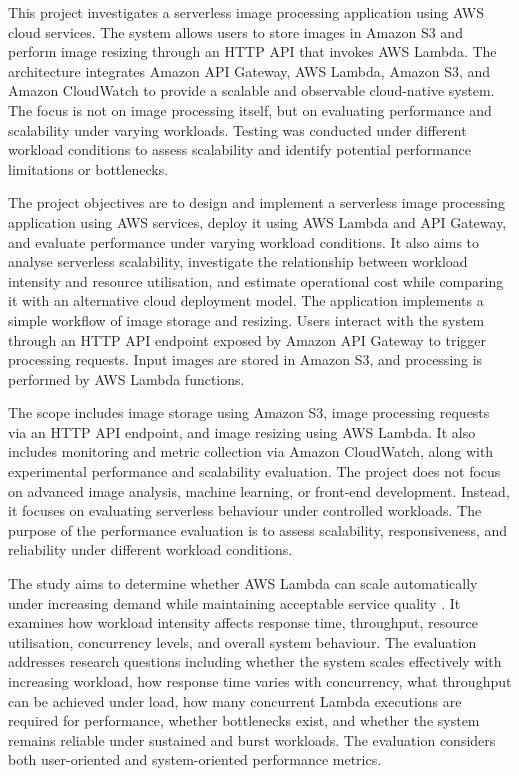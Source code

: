 \documentclass[11pt,a4paper,twocolumn]{article}
\begin{document}
This project investigates a serverless image processing application using AWS cloud services. The system allows users to store images in Amazon S3 and perform image resizing through an HTTP API that invokes AWS Lambda. The architecture integrates Amazon API Gateway, AWS Lambda, Amazon S3, and Amazon CloudWatch to provide a scalable and observable cloud-native system.
The focus is not on image processing itself, but on evaluating performance and scalability under varying workloads. Testing was conducted under different workload conditions to assess scalability and identify potential performance limitations or bottlenecks.

The project objectives are to design and implement a serverless image processing application using AWS services, deploy it using AWS Lambda and API Gateway, and evaluate performance under varying workload conditions. It also aims to analyse serverless scalability, investigate the relationship between workload intensity and resource utilisation, and estimate operational cost while comparing it with an alternative cloud deployment model.
The application implements a simple workflow of image storage and resizing. Users interact with the system through an HTTP API endpoint exposed by Amazon API Gateway to trigger processing requests. Input images are stored in Amazon S3, and processing is performed by AWS Lambda functions.

The scope includes image storage using Amazon S3, image processing requests via an HTTP API endpoint, and image resizing using AWS Lambda. It also includes monitoring and metric collection via Amazon CloudWatch, along with experimental performance and scalability evaluation.
The project does not focus on advanced image analysis, machine learning, or front-end development. Instead, it focuses on evaluating serverless behaviour under controlled workloads.
The purpose of the performance evaluation is to assess scalability, responsiveness, and reliability under different workload conditions.

The study aims to determine whether AWS Lambda can scale automatically under increasing demand while maintaining acceptable service quality \citep{jonas2019cloud}. It examines how workload intensity affects response time, throughput, resource utilisation, concurrency levels, and overall system behaviour.
The evaluation addresses research questions including whether the system scales effectively with increasing workload, how response time varies with concurrency, what throughput can be achieved under load, how many concurrent Lambda executions are required for performance, whether bottlenecks exist, and whether the system remains reliable under sustained and burst workloads.
The evaluation considers both user-oriented and system-oriented performance metrics.
\end{document}
